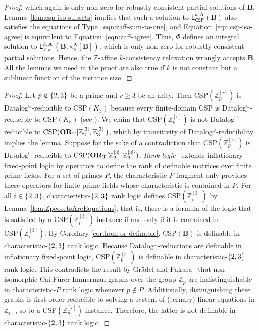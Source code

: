 \documentclass[a4paper,english, thm-restate]{lipics-v2021}
\newcommand{\ZZ}{\mathbb{Z}}
\DeclarePairedDelimiter\set{\lbrace}{\rbrace}
\newcommand{\StructA}{\mathbf{A}}
\newcommand{\StructB}{\mathbf{B}}
\newcommand{\CSP}[1]{\mathrm{CSP}(#1)}
\newcommand{\leqs}{\mathsf{L}}
\newcommand{\cspiso}[3]{\leqs^{#1,#2}_{\mathsf{CSP}}(#3)}
\newcommand{\zafkleq}[4]{\leqs^{#1,#2}_{\ZZ\mathsf{\text{-}aff}}(#3,#4)}
\newcommand{\bbZ}{\mathbb{Z}}
\newcommand{\CosetGrpTmplt}[2]{#1^{[#2]}}
\begin{document}
\begin{proof}
		which again is only non-zero for robustly consistent partial solutions of $\StructB$.
		Lemma~\ref{lem:csp-iso-subsets} implies that such a solution to $\cspiso{k}{\StructA}{\StructB}$ also satisfies the equations of Type~\ref{eqn:zaff-sum-to-one}, and 
		Equation~\ref{eqn:csp-iso-agree} is equivalent to Equation~\ref{eqn:zaff-agree}.
		Thus, $\Phi$ defines an integral solution to $\zafkleq{k}{\StructA}{\StructB}{\kappa_k^{\StructA}[\StructB]}$,
		which is only non-zero for robustly consistent partial solutions.
		Hence, the $\ZZ$-affine $k$-consistency relaxation wrongly accepts $\StructB$. All the lemmas we need in the proof are also true if $k$ is not constant but a sublinear function of the instance size.
	\end{proof}
	
	\notDatalogReducible*
	\begin{proof}
		Let $p \notin \set{2,3}$ be a prime
		and $r\geq 3$ be an arity.
		Then $\CSP{\CosetGrpTmplt{\ZZ_p}{r}}$ is Datalog$^\cup$-reducible to $\CSP{K_3}$
		because every finite-domain CSP is Datalog$^\cup$-reducible to $\CSP{K_3}$ (see \cite{DalmauOprsal2024}). 
		We claim that $\CSP{\CosetGrpTmplt{\ZZ_p}{r}}$ is not Datalog$^\cup$-reducible to $\CSP{\ZtwoOrThreeInst}$, which by transitivity of Datalog$^\cup$-reducibility~\cite{DalmauOprsal2024} implies the lemma.
		Suppose for the sake of a contradiction that $\CSP{\CosetGrpTmplt{\ZZ_p}{r}}$
		is Datalog$^\cup$-reducible to $\CSP{\ZtwoOrThreeInst}$. 
		\emph{Rank logic}~\cite{DawarGHL09}
		extends inflationary fixed-point logic by operators
		to define the rank of definable matrices
		over finite prime fields.
		For a set of primes $P$, the characteristic-$P$ fragment
		only provides these operators for finite prime fields
		whose characteristic is contained in $P$.
		For all $i\in\set{2,3}$,
		characteristic-$\set{2,3}$ rank logic
		defines $\CSP{\CosetGrpTmplt{\ZZ_i}{3}}$ by Lemma~\ref{lem:ZpcosetsAreEquations}, that is,
		there is a formula of the logic that is satisfied by a $\CSP{\CosetGrpTmplt{\ZZ_i}{3}}$-instance if and only if it is
		contained in $\CSP{\CosetGrpTmplt{\ZZ_i}{3}}$.
		By Corollary \ref{cor:hom-or-definable}, $\CSP{\StructB}$ 
		is definable in characteristic-$\set{2,3}$ rank logic.
		Because Datalog$^\cup$-reductions are definable in inflationary fixed-point logic,
		$\CSP{\CosetGrpTmplt{\ZZ_p}{r}}$
		is definable in characteristic-$\set{2,3}$ rank logic.
		This contradicts the result by Grädel and Pakusa~\cite{GradelPakusa19} that non-isomorphic
		Cai-Fürer-Immerman graphs over the group $\bbZ_p$ are indistinguishable in characteristic-$P$ rank logic whenever $p \notin P$.
		Additionally, distinguishing these graphs is first-order-reducible to solving a system of (ternary) linear equations in $\bbZ_p$~\cite[Lemma 18]{GradelPakusa19},
		so to a $\CSP{\CosetGrpTmplt{\ZZ_p}{r}}$-instance.
		Therefore, the latter is not definable in characteristic-$\set{2,3}$ rank logic.
	\end{proof}
	
\end{document}
